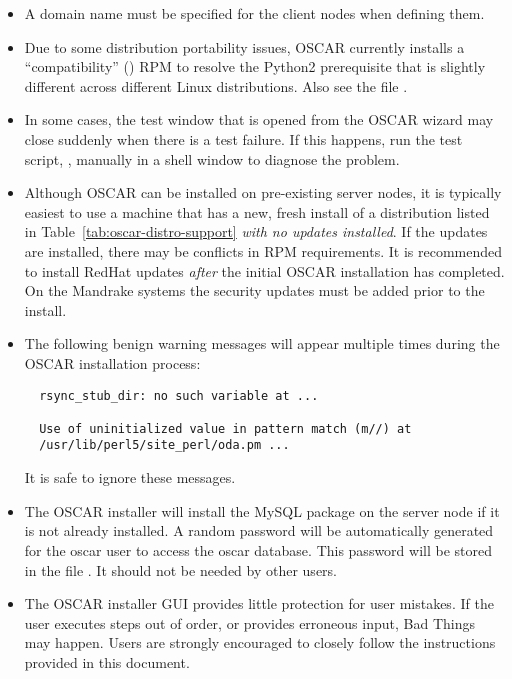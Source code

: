 \begin{itemize}
\item A domain name must be specified for the client nodes when
  defining them.

\item Due to some distribution portability issues, OSCAR currently installs
  a ``compatibility''  () RPM to resolve the
  Python2 prerequisite that is slightly different across different Linux
  distributions.  Also see the file .

\item In some cases, the test window that is opened from the
  OSCAR wizard may close suddenly when there is a test failure. If
  this happens, run the test script, ,
  manually in a shell window to diagnose the problem.

\item Although OSCAR can be installed on pre-existing server nodes, it
  is typically easiest to use a machine that has a new, fresh install
  of a distribution listed in Table~\ref{tab:oscar-distro-support}
  {\em with no updates installed}.  If the updates are installed,
  there may be conflicts in RPM requirements.  It is recommended to
  install RedHat updates {\em after} the initial OSCAR installation has
  completed.  On the Mandrake systems the security updates must be added
  prior to the install.

\item The following benign warning messages will appear multiple times
  during the OSCAR installation process:

\begin{verbatim}
  rsync_stub_dir: no such variable at ...

  Use of uninitialized value in pattern match (m//) at
  /usr/lib/perl5/site_perl/oda.pm ...
\end{verbatim}

  It is safe to ignore these messages.

\item The OSCAR installer will install the MySQL package on the server
  node if it is not already installed.  A random password will be automatically
\begchange
  generated for the oscar user to access the oscar database.  This
  password will be stored in the file .  It should
  not be needed by other users.
\endchange

\item The OSCAR installer GUI provides little protection for user
  mistakes.  If the user executes steps out of order, or provides
  erroneous input, Bad Things may happen.  Users are strongly
  encouraged to closely follow the instructions provided in this
  document.


\end{itemize}
